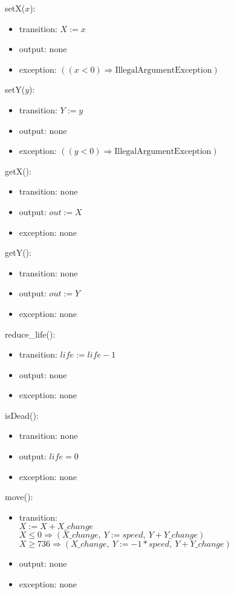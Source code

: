 \documentclass[12pt]{article}
\begin{document}
\noindent setX($\mathit{x}$):
\begin{itemize}
\item transition: $X := x$ 
\item output: none
\item exception: $((\mathit{x} < 0) \Rightarrow \text{IllegalArgumentException})$
\end{itemize}

\noindent setY($\mathit{y}$):
\begin{itemize}
\item transition: $Y := y$ 
\item output: none
\item exception: $((\mathit{y} < 0) \Rightarrow \text{IllegalArgumentException})$
\end{itemize}

\noindent getX():
\begin{itemize}
\item transition: none
\item output: $out := X$
\item exception: none
\end{itemize}

\noindent getY():
\begin{itemize}
\item transition: none
\item output: $out := Y$
\item exception: none
\end{itemize}

\noindent reduce\_life():
\begin{itemize}
\item transition: $life := life - 1$
\item output: none
\item exception: none
\end{itemize}

\noindent isDead():
\begin{itemize}
\item transition: none
\item output: $life = 0$
\item exception: none
\end{itemize}

\noindent move():
\begin{itemize}
\item transition: \\
$X := X + X\_change$\\
$X \leq 0 \Rightarrow (X\_change,\ Y  := speed,\ Y + Y\_change)$\\
$X \geq 736 \Rightarrow (X\_change,\ Y  := -1*speed,\ Y + Y\_change)$
\item output: none
\item exception: none
\end{itemize}
\newpage
\end{document}
